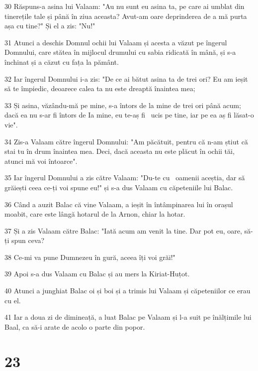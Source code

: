 \par 30 Răspuns-a asina lui Valaam: "Au nu sunt eu asina ta, pe care ai umblat din tinerețile tale și până în ziua aceasta? Avut-am oare deprinderea de a mă purta așa cu tine?" Și el a zis: "Nu!"
\par 31 Atunci a deschis Domnul ochii lui Valaam și acesta a văzut pe îngerul Domnului, care stătea în mijlocul drumului cu sabia ridicată în mână, și s-a închinat și a căzut cu fața la pământ.
\par 32 Iar îngerul Domnului i-a zis: "De ce ai bătut asina ta de trei ori? Eu am ieșit să te împiedic, deoarece calea ta nu este dreaptă înaintea mea;
\par 33 Și asina, văzându-mă pe mine, s-a întors de la mine de trei ori până acum; dacă ea nu s-ar fi întors de Ia mine, eu te-aș fi  ucis pe tine, iar pe ea aș fi lăsat-o vie".
\par 34 Zis-a Valaam către îngerul Domnului: "Am păcătuit, pentru că n-am știut că stai tu în drum înaintea mea. Deci, dacă aceasta nu este plăcut în ochii tăi, atunci mă voi întoarce".
\par 35 Iar îngerul Domnului a zis către Valaam: "Du-te cu  oamenii aceștia, dar să grăiești ceea ce-ți voi spune eu!" și s-a dus Valaam cu căpeteniile lui Balac.
\par 36 Când a auzit Balac că vine Valaam, a ieșit în întâmpinarea lui în orașul moabit, care este lângă hotarul de la Arnon, chiar la hotar.
\par 37 Și a zis Valaam către Balac: "Iată acum am venit la tine. Dar pot eu, oare, să-ți spun ceva?
\par 38 Ce-mi va pune Dumnezeu în gură, aceea îți voi grăi!"
\par 39 Apoi s-a dus Valaam cu Balac și au mers la Kiriat-Huțot.
\par 40 Atunci a junghiat Balac oi și boi și a trimis lui Valaam și căpeteniilor ce erau cu el.
\par 41 Iar a doua zi de dimineață, a luat Balac pe Valaam și l-a suit pe înălțimile lui Baal, ca să-i arate de acolo o parte din popor.

\chapter{23}

